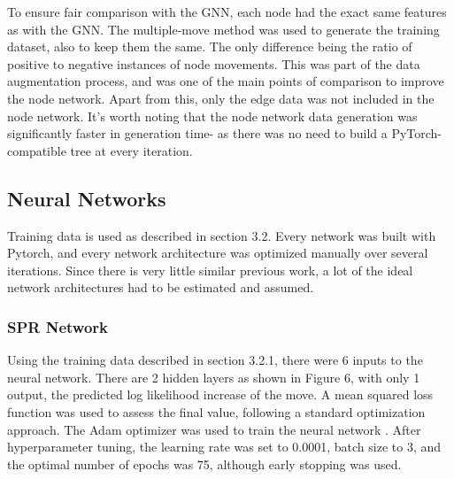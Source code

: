 \documentclass{mpaper}
\begin{document}
To ensure fair comparison with the GNN, each node had the exact same features as with the GNN. The multiple-move method was used to generate the training dataset, also to keep them the same. The only difference being the ratio of positive to negative instances of node movements. This was part of the data augmentation process, and was one of the main points of comparison to improve the node network. Apart from this, only the edge data was not included in the node network. It's worth noting that the node network data generation was significantly faster in generation time- as there was no need to build a PyTorch-compatible tree at every iteration. 


\subsection{Neural Networks}

Training data is used as described in section 3.2. Every network was built with Pytorch, and every network architecture was optimized manually over several iterations. Since there is very little similar previous work, a lot of the ideal network architectures had to be estimated and assumed.

\subsubsection{SPR Network}

Using the training data described in section 3.2.1, there were 6 inputs to the neural network. There are 2 hidden layers as shown in Figure 6, with only 1 output, the predicted log likelihood increase of the move. A mean squared loss function was used to assess the final value, following a standard optimization approach. The Adam optimizer was used to train the neural network \cite{kingma2014adam}. After hyperparameter tuning, the learning rate was set to 0.0001, batch size to 3, and the optimal number of epochs was 75, although early stopping was used.
\end{document}
